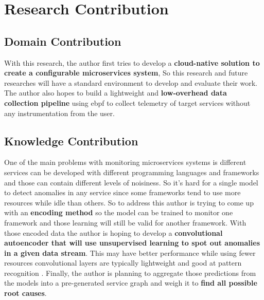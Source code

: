 \section{Research Contribution}


\subsection{Domain Contribution}

With this research, the author first tries to develop a \textbf{cloud-native solution to create a configurable microservices system}, So this research and future researches will have a standard environment to develop and evaluate their work. The author also hopes to build a lightweight and \textbf{low-overhead data collection pipeline} using \ac{ebpf} to collect telemetry of target services without any instrumentation from the user.

\subsection{Knowledge Contribution}

One of the main problems with monitoring microservices systems is different services can be developed with different programming languages and frameworks and those can contain different levels of noisiness\label{need-for-encoding}. So it's hard for a single model to detect anomalies in any service since some frameworks tend to use more resources while idle than others.  So to address this author is trying to come up with an \textbf{encoding method} so the model can be trained to monitor one framework and those learning will still be valid for another framework. With those encoded data the author is hoping to develop a \textbf{convolutional autoencoder that will use unsupervised learning to spot out anomalies in a given data stream}. This may have better performance while using fewer resources convolutional layers are typically lightweight and good at pattern recognition \citep{oord2016wavenet}. Finally, the author is planning to aggregate those predictions from the models into a pre-generated service graph and weigh it to \textbf{find all possible root causes}.
